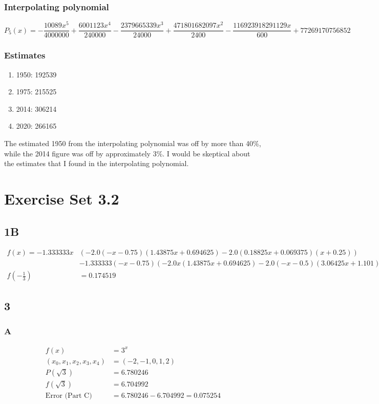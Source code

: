 \documentclass{oisinclass}
\begin{document}
\subsubsection*{Interpolating polynomial}
\[P_5(x) = -\frac{10089 x^{5}}{4000000} + \frac{6001123 x^{4}}{240000} - \frac{2379665339 x^{3}}{24000} + \frac{471801682097 x^{2}}{2400} - \frac{116923918291129 x}{600} + 77269170756852\]
\subsubsection*{Estimates}
\begin{enumerate}
	\item 1950: 192539
	\item 1975: 215525
	\item 2014: 306214
	\item 2020: 266165
\end{enumerate}
The estimated 1950 from the interpolating polynomial was off by more than 40\%, while the 2014 figure was off by approximately 3\%. I would be skeptical about the estimates that I found in the interpolating polynomial.

\section*{Exercise Set 3.2}
\subsection*{1B}
\begin{align*}
	f(x) = - 1.333333 x        & \left(- 2.0 \left(- x - 0.75\right) \left(1.43875 x + 0.694625\right) - 2.0 \left(0.18825 x + 0.069375\right) \left(x + 0.25\right)\right)            \\
	                           & - 1.333333 \left(- x - 0.75\right) \left(- 2.0 x \left(1.43875 x + 0.694625\right) - 2.0 \left(- x - 0.5\right) \left(3.06425 x + 1.101\right)\right) \\
	f\left(-\frac{1}{3}\right) & = 0.174519
\end{align*}

\subsection*{3}
\subsubsection*{A}
\begin{align*}
	f(x)                      & = 3^x                            \\
	(x_0, x_1, x_2, x_3, x_4) & = (-2, -1, 0, 1, 2)              \\
	P(\sqrt{3})               & = 6.780246                       \\
	f(\sqrt{3})               & = 6.704992                       \\
	\text{Error (Part C)}     & = 6.780246 - 6.704992 = 0.075254
\end{align*}
\end{document}
